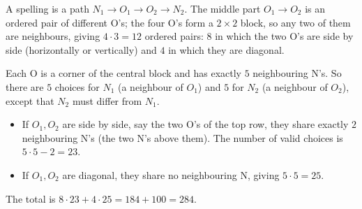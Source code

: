 A spelling is a path $N_1\to O_1\to O_2\to N_2$. The middle part $O_1\to O_2$ is an ordered pair of different O's; the four O's form a $2\times2$ block, so any two of them are neighbours, giving $4\cdot3=12$ ordered pairs: $8$ in which the two O's are side by side (horizontally or vertically) and $4$ in which they are diagonal.

Each O is a corner of the central block and has exactly $5$ neighbouring N's. So there are $5$ choices for $N_1$ (a neighbour of $O_1$) and $5$ for $N_2$ (a neighbour of $O_2$), except that $N_2$ must differ from $N_1$.
\begin{itemize}
\item If $O_1,O_2$ are side by side, say the two O's of the top row, they share exactly $2$ neighbouring N's (the two N's above them). The number of valid choices is $5\cdot5-2=23$.
\item If $O_1,O_2$ are diagonal, they share no neighbouring N, giving $5\cdot5=25$.
\end{itemize}
The total is $8\cdot23+4\cdot25=184+100=\boxed{284}$.
